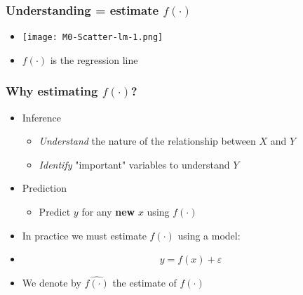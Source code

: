 \documentclass[xcolor=x11names,compress, aspectratio=169]{beamer}
\renewcommand{\(}{\begin{columns}}
\renewcommand{\)}{\end{columns}}
\newcommand{\<}[1]{\begin{column}{#1}}
\renewcommand{\>}{\end{column}}
\begin{document}
\begin{frame} %
\frametitle{Understanding = estimate $f(\cdot)$ }
 \begin{itemize}
  \item<+->[] \texttt{[image: M0-Scatter-lm-1.png]}
  \item<+->[]  $f(\cdot)$ is the regression line
 \end{itemize}
\end{frame}


\begin{frame} %
\frametitle{Why estimating $f(\cdot)$?}
 \begin{itemize}
  \item<+-> Inference
   \begin{itemize}
  \item<+->[] \textit{Understand} the nature of the relationship between $X$ and $Y$
  \item<+->[] \textit{Identify}  "important" variables to understand $Y$
 \end{itemize}
  \item<+-> Prediction
   \begin{itemize}
  \item<+->[] Predict $y$ for any \textbf{new} $x$ using $f(\cdot)$
 \end{itemize}
 \item<+-> In practice we must estimate  $f(\cdot)$ using a model:
 \item<+->[] $$ y = f(x) + \varepsilon $$
 \item<+->[] We denote by $\widehat{f(\cdot)}$ the estimate of $f(\cdot)$
 \end{itemize}
\end{frame}
\end{document}
